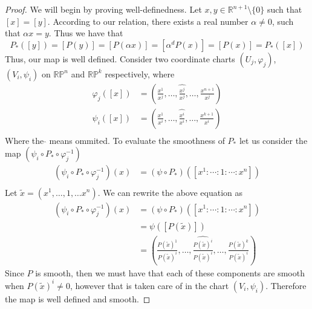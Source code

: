 \documentclass[a4paper]{article}
\begin{document}
\begin{proof}
  We will begin by proving well-definedness. Let $x,y \in \mathds{R}^{n+1} \setminus \{0\}$ such that $[x] = [y]$. According to our relation, there exists a real number $\alpha \neq 0$, such that $\alpha x = y$. Thus we have that
  \[
    P_{*}([y]) = [P(y)] = [P(\alpha x)] = [\alpha^d P(x)] = [P(x)] = P_{*}([x])
  \]
  Thus, our map is well defined. Consider two coordinate charts $(U_j, \varphi_j)$, $(V_i, \psi_i)$ on $\mathds{RP}^n$ and $\mathds{RP}^k$ respectively, where 
  \[
    \begin{aligned}
      \varphi_j([x]) &= \left( \frac{x^1}{x^j}, \dots, \widehat{\frac{x^j}{x^j}}, \dots, \frac{x^{n+1}}{x^j} \right) \\
      \psi_i([x]) &= \left( \frac{x^1}{x^i}, \dots, \widehat{\frac{x^i}{x^i}}, \dots, \frac{x^{k+1}}{x^i} \right) \\
    \end{aligned}
  \]
  Where the $\widehat{}$ means ommited. To evaluate the smoothness of $P_{*}$ let us consider the map $(\psi_i \circ P_{*} \circ \varphi_j^{-1})$
  \[
    \begin{aligned}
      (\psi_i \circ P_{*} \circ \varphi_j^{-1})(x) &= (\psi \circ P_*)([x^1: \cdots : 1 : \cdots: x^n]) \\
    \end{aligned}
  \]
  Let $\tilde{x} = (x^1, \dots, 1, \dots x^n)$. We can rewrite the above equation as 
\[
  \begin{aligned}
    (\psi_i \circ P_{*} \circ \varphi_j^{-1})(x) &= (\psi \circ P_*)([x^1: \cdots : 1 : \cdots: x^n]) \\
                                                 &= \psi ([P(\tilde{x})]) \\
                                                 &= \left(\frac{P(\tilde{x})^1}{P(\tilde{x})^i}, \dots, \widehat{\frac{P(\tilde{x})^i}{P(\tilde{x})^i}}, \dots,  \frac{P(\tilde{x})^k}{P(\tilde{x})^i} \right)
  \end{aligned}
\]
Since $P$ is smooth, then we must have that each of these components are smooth when $P(\tilde{x})^i \neq 0$, however that is taken care of in the chart $(V_i,\psi_i)$. Therefore the map is well defined and smooth.
\end{proof}
\end{document}
